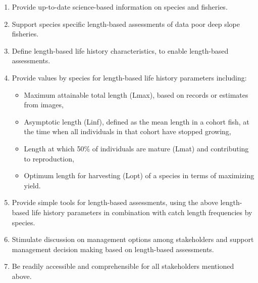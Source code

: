 \begin{enumerate}[noitemsep,topsep=0pt,parsep=0pt,partopsep=0pt,leftmargin=*]
\item Provide up-to-date science-based information on species and fisheries.
\item Support species specific length-based assessments of data poor deep slope fisheries.
\item Define length-based life history characteristics, to enable length-based assessments.
\item Provide values by species for length-based life history parameters including:
	\begin{itemize}[noitemsep,topsep=0pt,parsep=0pt,partopsep=0pt,leftmargin=*]
	\item Maximum attainable total length (Lmax), based on records or estimates from images,
	\item Asymptotic length (Linf), defined as the mean length in a cohort fish, at the time when all individuals in that cohort have stopped growing,
	\item Length at which 50\% of individuals are mature (Lmat) and contributing to reproduction,
	\item Optimum length for harvesting (Lopt) of a species in terms of maximizing yield.
	\end{itemize}
\item Provide simple tools for length-based assessments, using the above length-based life history parameters in combination with catch length frequencies by species.
\item Stimulate discussion on management options among stakeholders and support management decision making based on length-based assessments.
\item Be readily accessible and comprehensible for all stakeholders mentioned above.
\end{enumerate}
